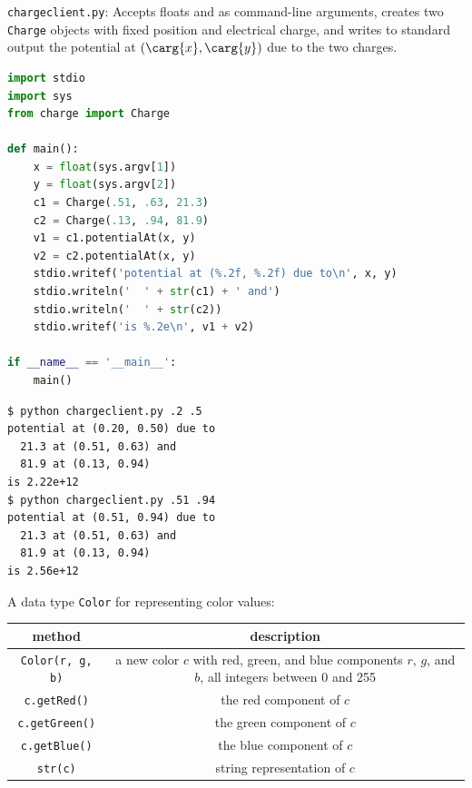 \documentclass[8pt,a4paper,compress,handout]{beamer}
\begin{document}
\begin{frame}[fragile]
\begin{framed}
\tiny \lstinline{chargeclient.py}: Accepts floats  and  as command-line arguments, creates two \lstinline{Charge} objects with fixed position and electrical charge, and writes to standard output the potential at $(\carg{x}, \carg{y})$ due to the two charges.
\end{framed}

\begin{lstlisting}[language=Python]
import stdio
import sys
from charge import Charge

def main():
    x = float(sys.argv[1])
    y = float(sys.argv[2])
    c1 = Charge(.51, .63, 21.3)
    c2 = Charge(.13, .94, 81.9)
    v1 = c1.potentialAt(x, y)
    v2 = c2.potentialAt(x, y)
    stdio.writef('potential at (%.2f, %.2f) due to\n', x, y)
    stdio.writeln('  ' + str(c1) + ' and')
    stdio.writeln('  ' + str(c2))
    stdio.writef('is %.2e\n', v1 + v2)

if __name__ == '__main__':
    main()
\end{lstlisting}

\begin{lstlisting}[language={}]
$ python chargeclient.py .2 .5
potential at (0.20, 0.50) due to
  21.3 at (0.51, 0.63) and
  81.9 at (0.13, 0.94)
is 2.22e+12
$ python chargeclient.py .51 .94
potential at (0.51, 0.94) due to
  21.3 at (0.51, 0.63) and
  81.9 at (0.13, 0.94)
is 2.56e+12
\end{lstlisting}
\end{frame}

\begin{frame}[fragile]
A data type \lstinline{Color} for representing color values:
\begin{center}
\begin{tabular}{cc}
method & description \\ \hline
\lstinline$Color(r, g, b)$ & \makecell{a new color $c$ with red, green, and blue components \\ $r$, $g$, and $b$, all integers between 0 and 255} \\
\lstinline$c.getRed()$ & the red component of $c$ \\
\lstinline$c.getGreen()$ & the green component of $c$ \\
\lstinline$c.getBlue()$ & the blue component of $c$ \\
\lstinline$str(c)$ & string representation of $c$
\end{tabular} 
\end{center}
\end{frame}
\end{document}
